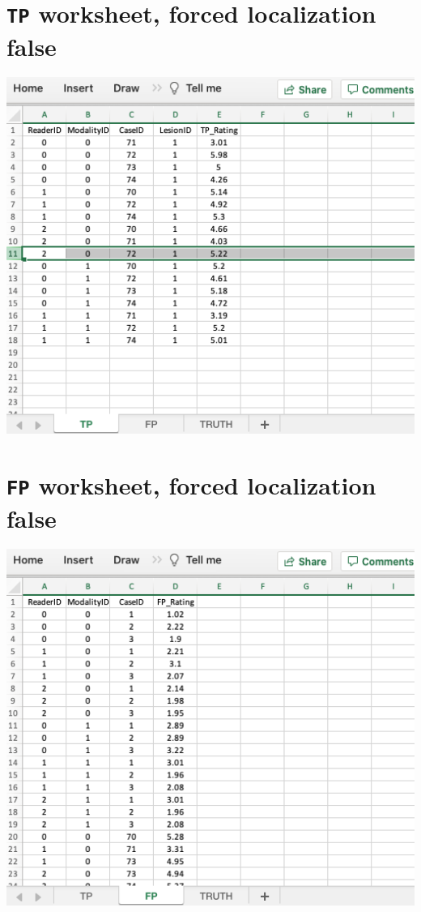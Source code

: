 \documentclass[
]{book}
\begin{document}
\hypertarget{quick-start-lroc-tp2}{%
\section{\texorpdfstring{\texttt{TP} worksheet, forced localization false}{TP worksheet, forced localization false}}\label{quick-start-lroc-tp2}}

\includegraphics[width=1\textwidth,height=\textheight]{images/quick-start/lroc2TP.png}

\hypertarget{quick-start-lroc-fp2}{%
\section{\texorpdfstring{\texttt{FP} worksheet, forced localization false}{FP worksheet, forced localization false}}\label{quick-start-lroc-fp2}}

\includegraphics[width=1\textwidth,height=\textheight]{images/quick-start/lroc2FP1.png}
\end{document}
